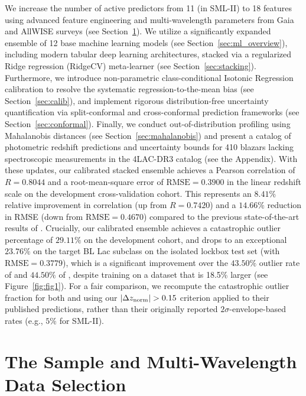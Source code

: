 \documentclass[twocolumn,linenumbers,floatfix]{aastex701}
\begin{document}
We increase the number of active predictors from 11 (in SML-II) to 18 features using advanced feature engineering and multi-wavelength parameters from Gaia and AllWISE surveys (see Section~\ref{sec:sample}). We utilize a significantly expanded ensemble of 12 base machine learning models (see Section~\ref{sec:ml_overview}), including modern tabular deep learning architectures, stacked via a regularized Ridge regression (RidgeCV) meta-learner (see Section~\ref{sec:stacking}). Furthermore, we introduce non-parametric class-conditional Isotonic Regression calibration to resolve the systematic regression-to-the-mean bias (see Section~\ref{sec:calib}), and implement rigorous distribution-free uncertainty quantification via split-conformal and cross-conformal prediction frameworks (see Section~\ref{sec:conformal}). Finally, we conduct out-of-distribution profiling using Mahalanobis distances (see Section~\ref{sec:mahalanobis}) and present a catalog of photometric redshift predictions and uncertainty bounds for 410 blazars lacking spectroscopic measurements in the 4LAC-DR3 catalog (see the Appendix). With these updates, our calibrated stacked ensemble achieves a Pearson correlation of $R = 0.8044$ and a root-mean-square error of $\text{RMSE} = 0.3900$ in the linear redshift scale on the development cross-validation cohort. This represents an $8.41\%$ relative improvement in correlation (up from $R = 0.7420$) and a $14.66\%$ reduction in RMSE (down from $\text{RMSE} = 0.4670$) compared to the previous state-of-the-art results of \citet{Narendra2022}. Crucially, our calibrated ensemble achieves a catastrophic outlier percentage of $29.11\%$ on the development cohort, and drops to an exceptional $23.76\%$ on the target BL Lac subclass on the isolated lockbox test set (with $\text{RMSE} = 0.3779$), which is a significant improvement over the $43.50\%$ outlier rate of \citet{Narendra2022} and $44.50\%$ of \citet{Dainotti2021}, despite training on a dataset that is 18.5\% larger (see Figure~\ref{fig:fig1}). For a fair comparison, we recompute the catastrophic outlier fraction for both \citet{Dainotti2021} and \citet{Narendra2022} using our $|\Delta z_{\rm norm}| > 0.15$ criterion applied to their published predictions, rather than their originally reported $2\sigma$-envelope-based rates (e.g., $5\%$ for SML-II).





\section{The Sample and Multi-Wavelength Data Selection}
\label{sec:sample}
\end{document}
